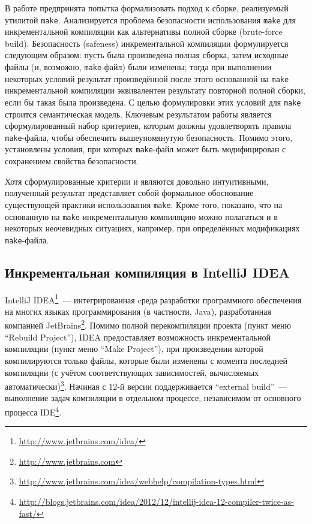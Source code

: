 В работе \cite{safeness_niels} предпринята попытка формализовать подход к сборке, реализуемый утилитой \texttt{make}. Анализируется проблема безопасности использования \texttt{make} для инкрементальной компиляции как альтернативы полной сборке (brute-force build). Безопасность (safeness) инкрементальной компиляции формулируется следующим образом: пусть была произведена полная сборка, затем исходные файлы (и, возможно, \texttt{make}-файл) были изменены; тогда при выполнении некоторых условий результат произведённой после этого основанной на \texttt{make} инкрементальной компиляции эквивалентен результату повторной полной сборки, если бы такая была произведена. С целью формулировки этих условий для \texttt{make} строится семантическая модель. Ключевым результатом работы является сформулированный набор критериев, которым должны удовлетворять правила \texttt{make}-файла, чтобы обеспечить вышеупомянутую безопасность. Помимо этого, установлены условия, при которых \texttt{make}-файл может быть модифицирован с сохранением свойства безопасности.

Хотя сформулированные критерии и являются довольно интуитивными, полученный результат представляет собой формальное обоснование существующей практики использования \texttt{make}. Кроме того, показано, что на основанную на \texttt{make} инкрементальную компиляцию можно полагаться и в некоторых неочевидных ситуациях, например, при определённых модификациях \texttt{make}-файла.\\

\subsection{Инкрементальная компиляция в IntelliJ IDEA}
IntelliJ IDEA\footnote{\url{http://www.jetbrains.com/idea/}}~--- интегрированная cреда разработки программного обеспечения на многих языках программирования (в частности, Java), разработанная компанией JetBrains\footnote{\url{http://www.jetbrains.com}}. Помимо полной перекомпиляции проекта (пункт меню ``Rebuild Project''), IDEA предоставляет возможность инкрементальной компиляции (пункт меню ``Make Project''), при произведении которой компилируются только файлы, которые были изменены с момента последней компиляции (с учётом соответствующих зависимостей, вычисляемых автоматически)\footnote{\url{http://www.jetbrains.com/idea/webhelp/compilation-types.html}}. Начиная с 12-й версии поддерживается ``external build''~--- выполнение задач компиляции в отдельном процессе, независимом от основного процесса IDE\footnote{\url{http://blogs.jetbrains.com/idea/2012/12/intellij-idea-12-compiler-twice-as-fast/}}.

